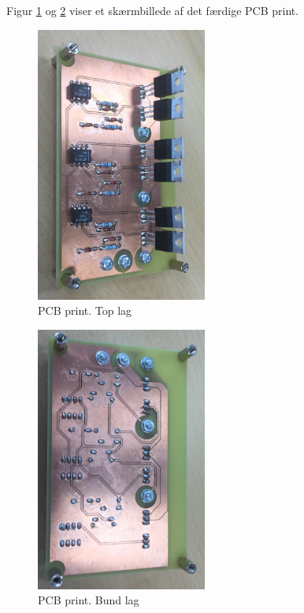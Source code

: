 Figur \ref{fig:nt3} og \ref{fig:nt4} viser et skærmbillede af det færdige PCB print.

\begin{figure}[h]
  \centering
  \includegraphics[angle=90,width=0.5\textwidth]{./figurer/nt3.png}
  \caption{PCB print. Top lag}
  \label{fig:nt3}
\end{figure}

\begin{figure}[h]
  \centering
  \includegraphics[angle=90,width=0.5\textwidth]{./figurer/nt4.png}
  \caption{PCB print. Bund lag}
  \label{fig:nt4}
\end{figure}


